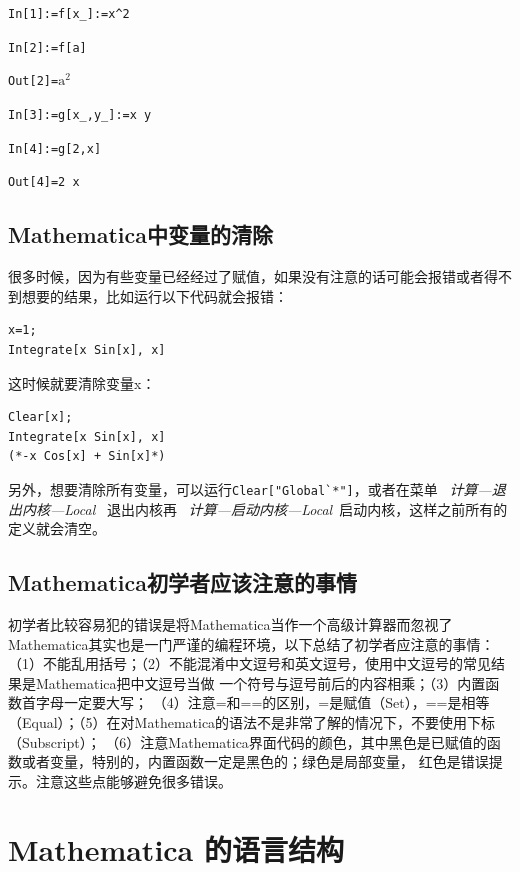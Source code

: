 \documentclass[UTF8,a4paper,10pt]{ctexart}
\newcommand{\mma}{Mathematica}
\begin{document}
\verb|In[1]:=f[x_]:=x^2|

\verb|In[2]:=f[a]|

\verb|Out[2]=|$\text{a}^2$

\verb|In[3]:=g[x_,y_]:=x y|

\verb|In[4]:=g[2,x]|

\verb|Out[4]=2 x|


\subsection{Mathematica中变量的清除}

很多时候，因为有些变量已经经过了赋值，如果没有注意的话可能会报错或者得不到想要的结果，比如运行以下代码就会报错：


\begin{lstlisting}
x=1;
Integrate[x Sin[x], x]
\end{lstlisting}

这时候就要清除变量x：
\begin{lstlisting}
Clear[x];
Integrate[x Sin[x], x]
(*-x Cos[x] + Sin[x]*)
\end{lstlisting}



另外，想要清除所有变量，可以运行\verb|Clear["Global`*"]|，或者在菜单~\emph{ 计算—退出内核—Local}~
退出内核再~\emph{ 计算—启动内核—Local}~启动内核，这样之前所有的定义就会清空。


\subsection{Mathematica初学者应该注意的事情}

初学者比较容易犯的错误是将\mma 当作一个高级计算器而忽视了\mma 其实也是一门严谨的编程环境，以下总结了初学者应注意的事情：（1）不能乱用括号；（2）不能混淆中文逗号和英文逗号，使用中文逗号的常见结果是Mathematica把中文逗号当做
一个符号与逗号前后的内容相乘；（3）内置函数首字母一定要大写；
（4）注意=和==的区别，=是赋值（Set），==是相等（Equal）；（5）在对Mathematica的语法不是非常了解的情况下，不要使用下标 （Subscript）；
（6）注意Mathematica界面代码的颜色，其中黑色是已赋值的函数或者变量，特别的，内置函数一定是黑色的；绿色是局部变量，
红色是错误提示。注意这些点能够避免很多错误。

\section{Mathematica 的语言结构}
\end{document}

